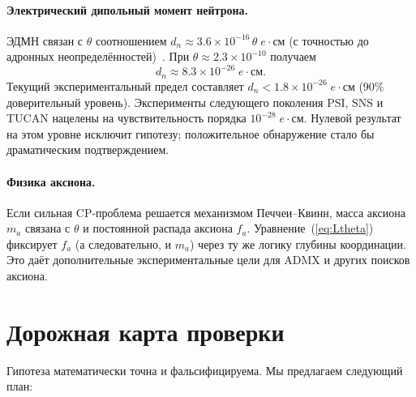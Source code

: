 \documentclass[11pt,a4paper]{article}
\begin{document}
	\paragraph{Электрический дипольный момент нейтрона.}
	ЭДМН связан с \(\theta\) соотношением \(d_n \approx 3.6 \times 10^{-16}\,\theta\; e\!\cdot\!\mathrm{см}\) (с точностью до адронных неопределённостей)~\cite{nEDM2020}. При \(\theta \approx 2.3 \times 10^{-10}\) получаем
	\[
	d_n \approx 8.3 \times 10^{-26}\; e\!\cdot\!\mathrm{см}.
	\]
	Текущий экспериментальный предел составляет \(d_n < 1.8 \times 10^{-26}\; e\!\cdot\!\mathrm{см}\) (90\% доверительный уровень). Эксперименты следующего поколения PSI, SNS и TUCAN нацелены на чувствительность порядка \(10^{-28}\; e\!\cdot\!\mathrm{см}\). Нулевой результат на этом уровне исключит гипотезу; положительное обнаружение стало бы драматическим подтверждением.
	
	\paragraph{Физика аксиона.}
	Если сильная CP-проблема решается механизмом Печчеи–Квинн, масса аксиона \(m_a\) связана с \(\theta\) и постоянной распада аксиона \(f_a\). Уравнение~(\ref{eq:Ltheta}) фиксирует \(f_a\) (а следовательно, и \(m_a\)) через ту же логику глубины координации. Это даёт дополнительные экспериментальные цели для ADMX и других поисков аксиона.
	
	\section{Дорожная карта проверки}
	\label{sec:roadmap}
	
	Гипотеза математически точна и фальсифицируема. Мы предлагаем следующий план:
	
\end{document}
